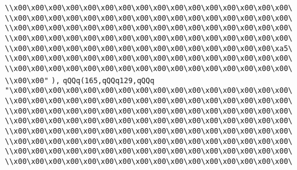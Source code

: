 \verb|\\x00\x00\x00\x00\x00\x00\x00\x00\x00\x00\x00\x00\x00\x00\x00\x00\|\newline
\verb|\\x00\x00\x00\x00\x00\x00\x00\x00\x00\x00\x00\x00\x00\x00\x00\x00\|\newline
\verb|\\x00\x00\x00\x00\x00\x00\x00\x00\x00\x00\x00\x00\x00\x00\x00\x00\|\newline
\verb|\\x00\x00\x00\x00\x00\x00\x00\x00\x00\x00\x00\x00\x00\x00\x00\x00\|\newline
\verb|\\x00\x00\x00\x00\x00\x00\x00\x00\x00\x00\x00\x00\x00\x00\x00\xa5\|\newline
\verb|\\x00\x00\x00\x00\x00\x00\x00\x00\x00\x00\x00\x00\x00\x00\x00\x00\|\newline
\verb|\\x00\x00\x00\x00\x00\x00\x00\x00\x00\x00\x00\x00\x00\x00\x00\x00\|\newline
\verb|\\x00\x00"|\newline
\verb|),|\newline
\verb|qQQq(165,qQQq129,qQQq|\newline
\verb|"\x00\x00\x00\x00\x00\x00\x00\x00\x00\x00\x00\x00\x00\x00\x00\x00\|\newline
\verb|\\x00\x00\x00\x00\x00\x00\x00\x00\x00\x00\x00\x00\x00\x00\x00\x00\|\newline
\verb|\\x00\x00\x00\x00\x00\x00\x00\x00\x00\x00\x00\x00\x00\x00\x00\x00\|\newline
\verb|\\x00\x00\x00\x00\x00\x00\x00\x00\x00\x00\x00\x00\x00\x00\x00\x00\|\newline
\verb|\\x00\x00\x00\x00\x00\x00\x00\x00\x00\x00\x00\x00\x00\x00\x00\x00\|\newline
\verb|\\x00\x00\x00\x00\x00\x00\x00\x00\x00\x00\x00\x00\x00\x00\x00\x00\|\newline
\verb|\\x00\x00\x00\x00\x00\x00\x00\x00\x00\x00\x00\x00\x00\x00\x00\x00\|\newline
\verb|\\x00\x00\x00\x00\x00\x00\x00\x00\x00\x00\x00\x00\x00\x00\x00\x00\|\newline
